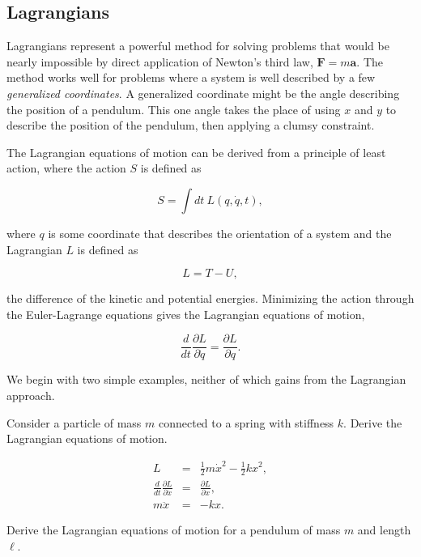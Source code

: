 \documentclass[%
oneside,                 %
final,                   %
10pt]{article}
\begin{document}
\subsection{Lagrangians}

Lagrangians represent a powerful method for solving problems that
would be nearly impossible by direct application of Newton's third
law, $\bm{F}=m\bm{a}$. The method works well for problems where a
system is well described by a few \textit{generalized coordinates}. A
generalized coordinate might be the angle describing the position of a
pendulum. This one angle takes the place of using $x$ and $y$ to
describe the position of the pendulum, then applying a clumsy
constraint.

The Lagrangian equations of motion can be derived from a principle of
least action, where the action $S$ is defined as

\begin{equation}
S=\int dt~ L(q,\dot{q},t),
\end{equation}

where $q$ is some coordinate that describes the orientation of a
system and the Lagrangian $L$ is defined as

\begin{equation}
L=T-U,
\end{equation}

the difference of the kinetic and potential energies. Minimizing the
action through the Euler-Lagrange equations gives the Lagrangian
equations of motion,

\begin{equation}
\frac{d}{dt}\frac{\partial L}{\partial \dot{q}}=\frac{\partial L}{\partial q}.
\end{equation}

We begin with two simple examples, neither of which gains from the Lagrangian approach.

Consider a particle of mass $m$ connected to a spring with stiffness $k$. Derive the Lagrangian equations of motion.

\begin{eqnarray*}
L&=&\frac{1}{2}m\dot{x}^2-\frac{1}{2}kx^2,\\
\frac{d}{dt}\frac{\partial L}{\partial \dot{x}}&=&\frac{\partial L}{\partial x},\\
m\ddot{x}&=&-kx.
\end{eqnarray*}

Derive the Lagrangian equations of motion for a pendulum of mass $m$
and length $\ell$.
\end{document}
